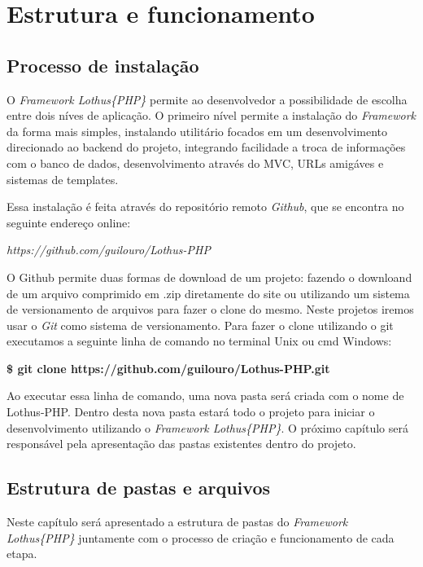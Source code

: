 \chapter{Estrutura e funcionamento\label{cap:detalhamento-projeto}}

    \section{Processo de instalação\label{sec:processo-instalacao}}
        O \emph{Framework Lothus\{PHP\}} permite ao desenvolvedor a possibilidade de escolha entre dois níves de aplicação. O primeiro nível permite a instalação do \emph{Framework} da forma mais simples, instalando utilitário focados em um desenvolvimento direcionado ao backend do projeto, integrando facilidade a troca de informações com o banco de dados, desenvolvimento através do MVC, URLs amigáves e sistemas de templates.

        Essa instalação é feita através do repositório remoto \emph{Github}, que se encontra no seguinte endereço online:

        \emph{https://github.com/guilouro/Lothus-PHP}

        O Github permite duas formas de download de um projeto: fazendo o downloand de um arquivo comprimido em .zip diretamente do site ou utilizando um sistema de versionamento de arquivos para fazer o clone do mesmo. Neste projetos iremos usar o \emph{Git} como sistema de versionamento. Para fazer o clone utilizando o git executamos a seguinte linha de comando no terminal Unix ou cmd Windows:

        \textbf{\$ git clone https://github.com/guilouro/Lothus-PHP.git}

        Ao executar essa linha de comando, uma nova pasta será criada com o nome de Lothus-PHP. Dentro desta nova pasta estará todo o projeto para iniciar o desenvolvimento utilizando o \emph{Framework Lothus\{PHP\}}. O próximo capítulo será responsável pela apresentação das pastas existentes dentro do projeto.



    \section{Estrutura de pastas e arquivos\label{sec:estrutura-pastas}}
        Neste capítulo será apresentado a estrutura de pastas do \emph{Framework Lothus\{PHP\}} juntamente com o processo de criação e funcionamento de cada etapa.

